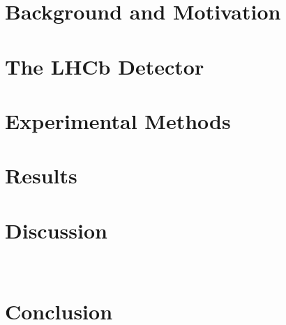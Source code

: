 \documentclass[11.5pt]{report}
\begin{document}
\setlength{\parskip}{1em}
\renewcommand{\baselinestretch}{1.5}

\newpage
\chapter{Background and Motivation}\label{Background and Motivation}


\chapter{The LHCb Detector}

\chapter{Experimental Methods}

\chapter{Results}
\chapter{Discussion}
\



\newpage
\chapter*{Conclusion}



\footnotesize
%
%







\label{lastpage}
{\huge}
\end{document}
